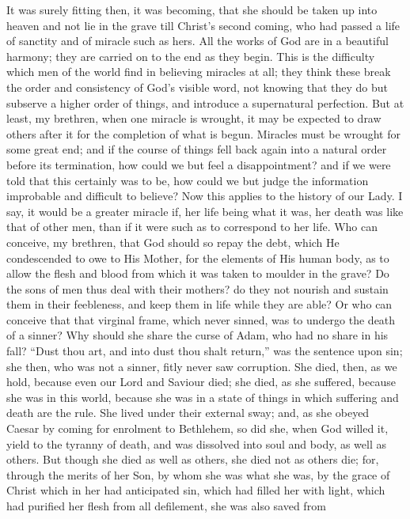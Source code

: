 It was surely fitting then, it was becoming, that she should be
taken up into heaven and not lie in the grave till Christ's second
coming, who had passed a life of sanctity and of miracle such as hers.
All the works of God are in a beautiful harmony; they are carried on
to the end as they begin. This is the difficulty which men of the
world find in believing miracles at all; they think these break the
order and consistency of God's visible word, not knowing that they do
but subserve a higher order of things, and introduce a supernatural
perfection. But at least, my brethren, when one miracle is wrought, it
may be expected to draw others after it for the completion of what is
begun. Miracles must be wrought for some great end; and if the course
of things fell back again into a natural order before its termination,
how could we but feel a disappointment? and if we were told that this
certainly was to be, how could we but judge the information improbable
and difficult to believe? Now this applies to the history of our Lady.
I say, it would be a greater miracle if, her life being what it was,
her death was like that of other men, than if it were such as to
correspond to her life. Who can conceive, my brethren, that God should
so repay the debt, which He condescended to owe to His Mother, for the
elements of His human body, as to allow the flesh and blood from which
it was taken to moulder in the grave? Do the sons of men thus deal
with their mothers? do they not nourish and sustain them in their
feebleness, and keep them in life while they are able? Or who can
conceive that that virginal frame, which never sinned, was to undergo
the death of a sinner? Why should she share the curse of Adam, who had
no share in his fall? ``Dust thou art, and into dust thou shalt
return,'' was the sentence upon sin; she then, who was not a
sinner, fitly never saw corruption. She died, then, as we hold,
because even our Lord and Saviour died; she died, as she suffered,
because she was in this world, because she was in a state of things in
which suffering and death are the rule. She lived under their external
sway; and, as she obeyed Caesar by coming for enrolment to Bethlehem,
so did she, when God willed it, yield to the tyranny of death, and was
dissolved into soul and body, as well as others. But though she died
as well as others, she died not as others die; for, through the merits
of her Son, by whom she was what she was, by the grace of Christ which
in her had anticipated sin, which had filled her with light, which had
purified her flesh from all defilement, she was also saved from
